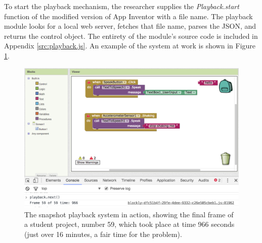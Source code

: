 To start the playback mechanism, the researcher supplies the \emph{Playback.start} function of the modified version of App Inventor with a file name. The playback module looks for a local web server, fetches that file name, parses the JSON, and returns the control object. The entirety of the module's source code is included in Appendix \ref{src:playback.js}. An example of the system at work is shown in Figure \ref{img:playback}.

\begin{figure}
  \centering
      \includegraphics[width=\textwidth]{images/ch3-playback}
  \caption[Snapshot playback]{The snapshot playback system in action, showing the final frame of a student project, number 59, which took place at time 966 seconds (just over 16 minutes, a fair time for the problem).}
  \label{img:playback}
\end{figure}



